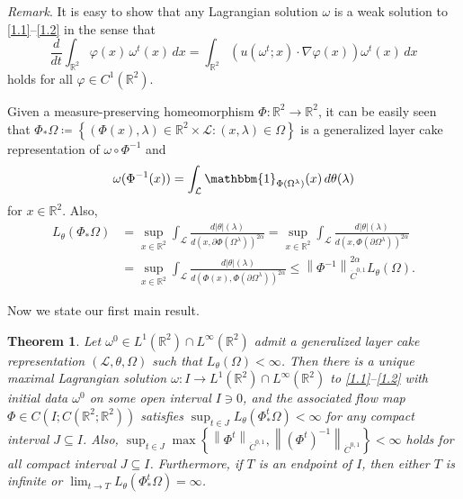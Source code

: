 \documentclass[reqno,centertags,12pt]{amsart}
\newtheorem{theorem}{Theorem}[section]
\theoremstyle{definition}
\numberwithin{equation}{section}
\newcommand{\norm}[1]{\left\|#1\right\|}
\newcommand{\set}[1]{\left\{ #1 \right\}}
\newcommand{\bbR}{{\mathbb{R}}}
\newcommand{\tht}{\theta}
\begin{document}
\textit{Remark}. It is easy to show that any Lagrangian solution $\omega$ is
a weak solution to \eqref{1.1}--\eqref{1.2} in the sense that
\[
    \frac{d}{dt}\int_{\bbR^{2}}\varphi(x)\,\omega^{t}(x)\,dx
    = \int_{\bbR^{2}}\left(u(\omega^{t};x)\cdot\nabla\varphi(x)\right)
    \omega^{t}(x)\,dx
\]
holds for all $\varphi\in C^{1}(\bbR^{2})$.\bigskip

Given a measure-preserving homeomorphism
$\Phi\colon\bbR^{2}\to\bbR^{2}$, it can be easily seen that
$\Phi_{*}\Omega\coloneqq\left\{(\Phi(x),\lambda)\in\bbR^{2}\times\mathcal{L}\colon
(x,\lambda)\in\Omega\right\}$ is a generalized layer cake representation of
$\omega\circ\Phi^{-1}$ and
\[
    \omega(\Phi^{-1}(x)) = \int_{\mathcal{L}}
    \mathbbm{1}_{\Phi(\Omega^{\lambda})}(x)\,d\theta(\lambda)
\]
for $x\in\bbR^{2}$. Also,
\begin{equation}\label{1.7}
    \begin{aligned}
        L_{\tht}(\Phi_{*}\Omega)
        &= \sup_{x\in\bbR^{2}}\int_{\mathcal{L}}\frac{d|\theta|(\lambda)}
        {d(x,\partial\Phi(\Omega^{\lambda}))^{2\alpha}}
        = \sup_{x\in\bbR^{2}}\int_{\mathcal{L}}\frac{d|\theta|(\lambda)}
        {d(x,\Phi(\partial\Omega^{\lambda}))^{2\alpha}} \\
        &= \sup_{x\in\bbR^{2}}\int_{\mathcal{L}}\frac{d|\theta|(\lambda)}
        {d(\Phi(x),\Phi(\partial\Omega^{\lambda}))^{2\alpha}}
        \leq \norm{\Phi^{-1}}_{\dot{C}^{0,1}}^{2\alpha} L_{\tht}(\Omega).
    \end{aligned}
\end{equation}

Now we state our first main result.

\begin{theorem}\label{T1.2}
    Let $\omega^{0}\in L^{1}(\bbR^{2})\cap L^{\infty}(\bbR^{2})$ admit
    a generalized layer cake representation $(\mathcal{L},\theta,\Omega)$ such that
    $L_{\tht}(\Omega)<\infty$. Then there is a unique maximal Lagrangian solution
    $\omega\colon I\to L^{1}(\bbR^{2})\cap L^{\infty}(\bbR^{2})$ to
    \eqref{1.1}--\eqref{1.2} with initial data $\omega^{0}$ on some open interval $I\ni 0$, 
    and the associated flow map $\Phi\in C\left(I;C(\bbR^{2};\bbR^{2})\right)$ satisfies
    $\sup_{t\in J}L_{\tht}(\Phi_{*}^{t}\Omega) < \infty$ for any compact interval $J\subseteq I$.
    Also, $\sup_{t\in J}\max\set{\norm{\Phi^{t}}_{\dot{C}^{0,1}},
    \norm{(\Phi^{t})^{-1}}_{\dot{C}^{0,1}}}<\infty$
    holds for all compact interval $J\subseteq I$.
    Furthermore, if $T$ is an endpoint of $I$, then either $T$ is infinite or
    $\lim_{t\to T}L_{\tht}(\Phi_{*}^{t}\Omega) = \infty$.
\end{theorem}
\end{document}
